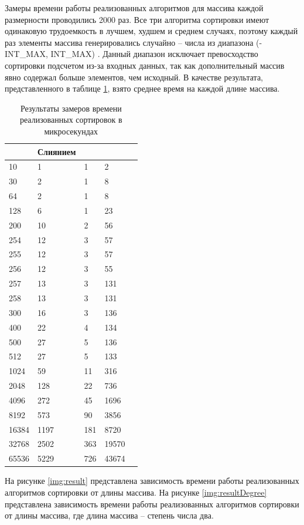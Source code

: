 Замеры времени работы реализованных алгоритмов для массива каждой размерности проводились 2000 раз. Все три алгоритма сортировки имеют одинаковую трудоемкость в лучшем, худшем и среднем случаях, поэтому каждый раз элементы массива генерировались случайно -- числа из диапазона (-INT\_MAX, INT\_MAX) \cite{si}. Данный диапазон исключает превосходство сортировки подсчетом из-за входных данных, так как дополнительный массив явно содержал больше элементов, чем исходный. В качестве результата, представленного в таблице \ref{tab:time}, взято среднее время на каждой длине массива.
\clearpage
\begin{table}
	\begin{center}
		\caption{\label{tab:time}Результаты замеров времени реализованных сортировок в микросекундах}
	\begin{tabular}{|l|l|l|l|l|}
		\hline \specialcell{Длина массива} & \specialcell{Слиянием\\} &
		 \specialcell{Подсчетом} & \specialcell{Битонная} \\\hline
		10 & 1 & 1 & 2 \\ \hline
		30 & 2 & 1 & 8 \\ \hline
		64 & 2 & 1 & 8 \\ \hline
		128 & 6  & 1  & 23 \\ \hline
		200 & 10 &  2 &  56 \\ \hline
		254 & 12 & 3 & 57 \\ \hline
		255 & 12 &  3 &  57 \\ \hline
		256 & 12 &  3 &  55 \\ \hline
		257 & 13 &  3 &  131   \\ \hline
		258 & 13 & 3 & 131 \\ \hline
		300 & 16 &  3 &  136 \\ \hline
		400 & 22 &  4 &  134 \\ \hline
		500 & 27 &  5 &  136 \\ \hline
		512 & 27 &  5 &  133 \\ \hline
		1024 & 59  & 11  & 316 \\ \hline
		2048 & 128 &  22 &  736 \\ \hline
		4096 & 272 &  45 &  1696 \\ \hline
		8192 & 573 &  90 &  3856  \\ \hline
		16384 & 1197 & 181 & 8720 \\ \hline
		32768 & 2502 & 363 & 19570 \\ \hline
		65536 & 5229 & 726 & 43674 \\ \hline
	\end{tabular}
	\end{center}
\end{table}
На рисунке \ref{img:result} представлена зависимость времени работы реализованных алгоритмов сортировки от длины массива. На рисунке \ref{img:resultDegree} представлена зависимость времени работы реализованных алгоритмов сортировки от длины массива, где длина массива -- степень числа два.

